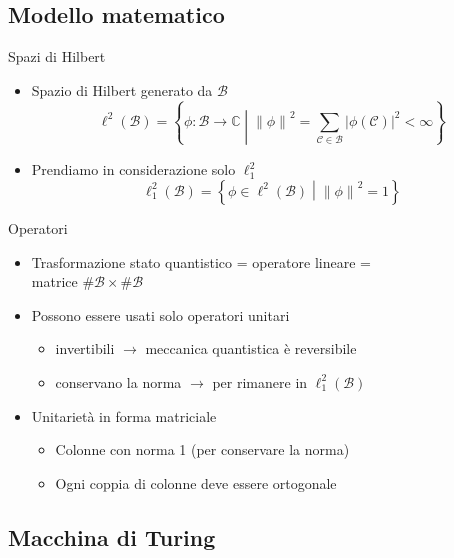 \documentclass{beamer}
\newcommand{\spacedmiddle}[1]{\mathrel{}\middle#1\mathrel{}}
\newcommand{\hil}{\ell^{2}}
\newcommand{\hiluninorm}{\hil_{1}}
\begin{document}
\subsection{Modello matematico}

\begin{frame}{\subsecname}{Spazi di Hilbert}
	\begin{itemize}
		\item<+-> \alert{Spazio di Hilbert} generato da \( \mathcal{B} \)
		\[ \hil \left ( \mathcal{B} \right ) = \left \{ \phi : \mathcal{B} \rightarrow \mathbb{C} \spacedmiddle | \left \| \phi \right \|^{2} = \sum_{\mathcal{C} \in \mathcal{B}} \left | \phi \left ( \mathcal{C} \right ) \right |^{2} < \infty \right \}\]
		\item<+-> Prendiamo in considerazione solo \(\hiluninorm\)
		\[ \hiluninorm \left ( \mathcal{B} \right ) = \left \{ \phi \in \hil \left ( \mathcal{B} \right ) \spacedmiddle | \left \| \phi \right \|^{2} = 1 \right \}\]
	\end{itemize}
\end{frame}

\begin{frame}{\subsecname}{Operatori}
	\begin{itemize}
		\item<+-> Trasformazione stato quantistico = operatore lineare = \\
		matrice \( \#\mathcal{B} \times \#\mathcal{B} \)
		\item<+-> Possono essere usati solo \alert{operatori unitari}
		\begin{itemize}
			\item invertibili \(\rightarrow\) meccanica quantistica è reversibile
			\item conservano la norma \(\rightarrow\) per rimanere in \(\hiluninorm \left ( \mathcal{B} \right )\)
		\end{itemize}
		\item<+-> Unitarietà in forma matriciale
		\begin{itemize}
			\item Colonne con norma 1 (per conservare la norma)
			\item Ogni coppia di colonne deve essere ortogonale
		\end{itemize}
	\end{itemize}
\end{frame}

\subsection{Macchina di Turing}
\end{document}
